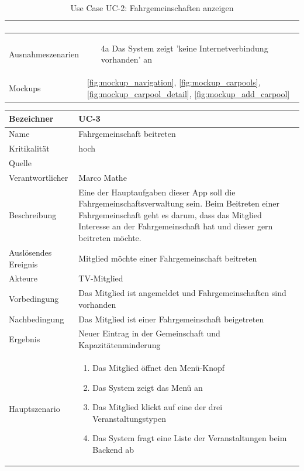 \begin{table}[ht]
\begin{tabular}{ l | p{10cm} }
\begin{enumerate}
					\end{enumerate}
					\\ \hline
	Ausnahmeszenarien&	\begin{enumerate}
					\item[4a] Das System zeigt 'keine Internetverbindung vorhanden' an
					\end{enumerate}
					\\ \hline
	Mockups	 	&	\ref{fig:mockup_navigation}, \ref{fig:mockup_carpools}, \ref{fig:mockup_carpool_detail},
					\ref{fig:mockup_add_carpool}
  \end{tabular}
   \caption{Use Case UC-2: Fahrgemeinschaften anzeigen}\label{table:use_case_2}
\end{table}


\begin{table}[ht]
\centering
  \begin{tabular}{ l | p{10cm} }
	\hline
	\rowcolor{gray}
	Bezeichner		&	UC-3\\ \hline
	Name			&	Fahrgemeinschaft beitreten\\ \hline
	Kritikalität		&	hoch\\ \hline
	Quelle			&	\glossarmark{Stakeholder}\\ \hline
	Verantwortlicher	&	Marco Mathe\\ \hline
	Beschreibung	&	Eine der Hauptaufgaben dieser App soll die Fahrgemeinschaftsverwaltung sein. Beim Beitreten einer Fahrgemeinschaft geht es darum, dass das Mitglied Interesse an der Fahrgemeinschaft hat und dieser gern beitreten möchte.\\ \hline
	Auslösendes Ereignis&	Mitglied möchte einer Fahrgemeinschaft beitreten\\ \hline
	Akteure		&	TV-Mitglied\\ \hline
	Vorbedingung	&	Das Mitglied ist angemeldet und Fahrgemeinschaften sind vorhanden\\ \hline
	Nachbedingung	&	Das Mitglied ist einer Fahrgemeinschaft beigetreten\\ \hline
	Ergebnis		&	Neuer Eintrag in der Gemeinschaft und Kapazitätenminderung\\ \hline
	Hauptszenario	&	\begin{enumerate}
					\item Das Mitglied öffnet den Menü-Knopf
					\item Das System zeigt das Menü an
					\item Das Mitglied klickt auf eine der drei Veranstaltungstypen
					\item Das System fragt eine Liste der Veranstaltungen beim Backend ab

\end{enumerate}
\end{tabular}
\end{table}
